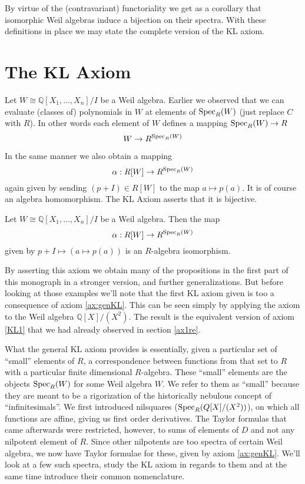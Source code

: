 By virtue of the (contravariant) functoriality we get as a corollary that isomorphic Weil algebras induce a bijection on their spectra. With these definitions in place we may state the complete version of the KL axiom.

\section{The KL Axiom}

Let \( W\cong \mathbb{Q}[X_1,\dots,X_n]/I \) be a Weil algebra. Earlier we observed that we can evaluate (classes of) polynomials in \( W \) at elements of \( \operatorname{Spec}_R(W) \) (just replace \( C \) with \( R \)). In other words each element of \( W \) defines a mapping \( \operatorname{Spec}_R(W)\to R \)
\begin{equation*}
  W\to R^{\operatorname{Spec}_R(W)}
\end{equation*}

In the same manner we also obtain a mapping
\begin{equation*}
  \alpha : R[W]\to R^{\operatorname{Spec}_R(W)}
\end{equation*}
again given by sending \( (p+I)\in R[W] \) to the map \( a\mapsto p(a) \). It is of course an algebra homomorphism. The KL Axiom asserts that it is bijective.
\begin{axiom}[KL]
  Let \( W\cong \mathbb{Q}[X_1,\dots,X_n]/I \) be a Weil algebra. Then the map
  \begin{equation*}
    \alpha : R[W]\to R^{\operatorname{Spec}_R(W)}
  \end{equation*}
  given by \( p+I \mapsto (a\mapsto p(a)) \) is an \( R \)-algebra isomorphism.
  \label{ax:genKL}
\end{axiom}

By asserting this axiom we obtain many of the propositions in the first part of this monograph in a stronger version, and further generalizations. But before looking at those examples we'll note that the first KL axiom given is too a consequence of axiom \ref{ax:genKL}. This can be seen simply by applying the axiom to the Weil algebra \( \mathbb{Q}[X]/(X^2) \). The result is the equivalent version of axiom \ref{KL1} that we had already observed in section \ref{ax1re}.

What the general KL axiom provides is essentially, given a particular set of ``small'' elements of \( R \), a correspondence between functions from that set to \( R \) with a particular finite dimensional \( R \)-algebra. These ``small'' elements are the objects \( \operatorname{Spec}_R(W) \) for some Weil algebra \( W \). We refer to them as ``small'' because they are meant to be a rigorization of the historically nebulous concept of ``infinitesimals''. We first introduced nilsquares (\( \operatorname{Spec}_R(Q[X]/(X^2)) \)), on which all functions are affine, giving us first order derivatives. The Taylor formulas that came afterwards were restricted, however, to sums of elements of \( D \) and not any nilpotent element of \( R \). Since other nilpotents are too spectra of certain Weil algebra, we now have Taylor formulae for these, given by axiom \ref{ax:genKL}. We'll look at a few such spectra, study the KL axiom in regards to them and at the same time introduce their common nomenclature.

